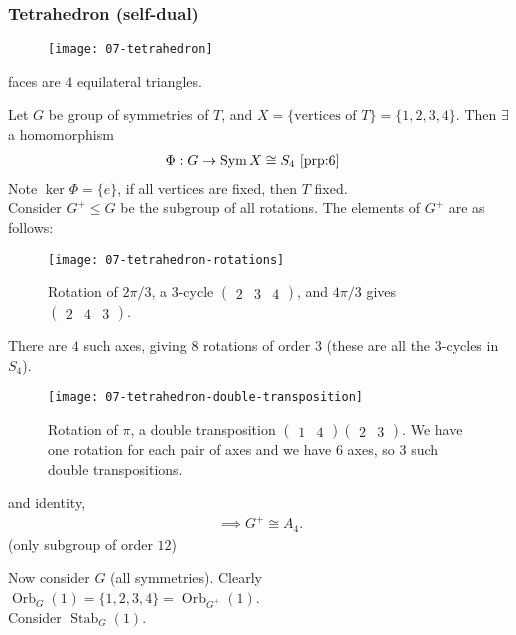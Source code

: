 \subsubsection{Tetrahedron (self-dual)}

\begin{figure}
    \centering 
    \texttt{[image: 07-tetrahedron]}
\end{figure} faces are $4$ equilateral triangles.

Let $G$ be group of symmetries of $T$, and $X = \{\text{vertices of } T\} = \{1, 2, 3, 4\}$.
Then $\exists$ a homomorphism
\begin{align*}
    \Phi : G &\to \operatorname{Sym} X \cong S_4 \text{ \Cref{prp:6}}
\end{align*} 
Note $\ker \Phi = \{ e \}$, if all vertices are fixed, then $T$ fixed. \\
Consider $G^+ \leq G$ be the subgroup of all rotations.
The elements of $G^+$ are as follows:

\begin{figure}
    \centering 
    \texttt{[image: 07-tetrahedron-rotations]} 
    \caption{Rotation of $2 \pi / 3$, a 3-cycle $\begin{pmatrix}2 & 3 & 4\end{pmatrix}$, and $4 \pi / 3$ gives $\begin{pmatrix}2 & 4 & 3\end{pmatrix}$.}
\end{figure}

There are $4$ such axes, giving $8$ rotations of order $3$ (these are all the $3$-cycles in $S_4$).

\begin{figure} 
    \centering 
    \texttt{[image: 07-tetrahedron-double-transposition]} 
    \caption{Rotation of $\pi$, a double transposition $\begin{pmatrix}1 & 4\end{pmatrix} \begin{pmatrix}2 & 3\end{pmatrix}$. We have one rotation for each pair of axes and we have $6$ axes, so $3$ such double transpositions.}
\end{figure}

and identity, 
\begin{align*}
    \implies G^+ \cong A_4.
\end{align*} (only subgroup of order $12$)

Now consider $G$ (all symmetries).
Clearly $\operatorname{Orb}_G(1) = \{1, 2, 3, 4\} = \operatorname{Orb}_{G^+}(1)$. \\
Consider $\operatorname{Stab}_G(1)$.


